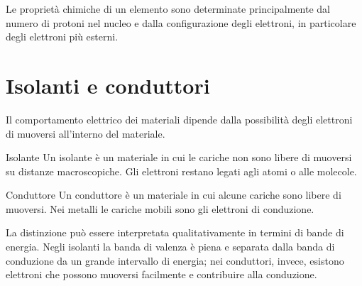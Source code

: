 \documentclass[a4paper]{article}
\begin{document}
Le proprietà chimiche di un elemento sono determinate principalmente dal numero di protoni nel nucleo e dalla configurazione degli elettroni, in particolare degli elettroni più esterni.

\section{Isolanti e conduttori}

Il comportamento elettrico dei materiali dipende dalla possibilità degli elettroni di muoversi all'interno del materiale.

\begin{snippetdefinition}{Isolante}
    Un isolante è un materiale in cui le cariche non sono libere di muoversi su distanze macroscopiche. Gli elettroni restano legati agli atomi o alle molecole.
\end{snippetdefinition}

\begin{snippetdefinition}{Conduttore}
    Un conduttore è un materiale in cui alcune cariche sono libere di muoversi. Nei metalli le cariche mobili sono gli elettroni di conduzione.
\end{snippetdefinition}

La distinzione può essere interpretata qualitativamente in termini di bande di energia. Negli isolanti la banda di valenza è piena e separata dalla banda di conduzione da un grande intervallo di energia; nei conduttori, invece, esistono elettroni che possono muoversi facilmente e contribuire alla conduzione.

\begin{center}
\end{center}
\end{document}
